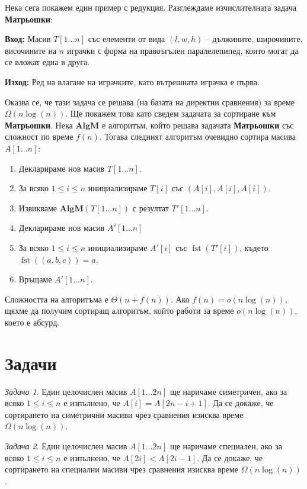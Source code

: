 \documentclass{article}
\theoremstyle{definition}
\theoremstyle{plain}
\theoremstyle{remark}
\newtheorem{problem}{Задача}
\theoremstyle{definition}
\begin{document}
Нека сега покажем един пример с редукция.
Разглеждаме изчислителната задача \textbf{Матрьошки}:

\textbf{Вход:} Масив $T[1 \dots n]$ със елементи от вида $(l, w, h)$ -- дължините, широчините, височините на $n$ играчки с форма на правоъгълен паралелепипед, които могат да се вложат една в друга.

\textbf{Изход:} Ред на влагане на играчките, като вътрешната играчка е първа.

Оказва се, че тази задача се решава (на базата на директни сравнения) за време $\Omega(n \log(n))$.
Ще покажем това като сведем задачата за сортиране към \textbf{Матрьошки}.
Нека $\mathbf{AlgM}$ е алгоритъм, който решава задачата \textbf{Матрьошки} със сложност по време $f(n)$.
Тогава следният алгоритъм очевидно сортира масива $A[1 \dots n]$:
\begin{enumerate}
    \item Декларираме нов масив $T[1 \dots n]$.
    \item За всяко $1 \leq i \leq n$ инициализираме $T[i]$ със $(A[i], A[i], A[i])$.
    \item Извикваме $\mathbf{AlgM}(T[1 \dots n])$ с резултат $T'[1 \dots n]$.
    \item Декларираме нов масив $A'[1 \dots n]$
    \item За всяко $1 \leq i \leq n$ инициализираме $A'[i]$ със $\operatorname{fst}(T'[i])$, където $\operatorname{fst}((a, b, c)) = a$.
    \item Връщаме $A'[1 \dots n]$.
\end{enumerate}
Сложността на алгоритъма е $\Theta(n + f(n))$.
Ако $f(n) = o(n \log(n))$, щяхме да получим сортиращ алгоритъм, който работи за време $o(n \log(n))$, което е абсурд.

\section*{Задачи}

\begin{problem}
Един целочислен масив $A[1 \dots 2n]$ ще наричаме симетричен, ако за всяко $1 \leq i \leq n$ е изпълнено, че $A[i] = A[2n - i + 1]$.
Да се докаже, че сортирането на симетрични масиви чрез сравнения изисква време $\Omega(n \log(n))$.
\end{problem}

\begin{problem}
Един целочислен масив $A[1 \dots 2n]$ ще наричаме специален, ако за всяко $1 \leq i \leq n$ е изпълнено, че $A[2i] < A[2i - 1]$.
Да се докаже, че сортирането на специални масиви чрез сравнения изисква време $\Omega(n \log(n))$.
\end{problem}
\end{document}
